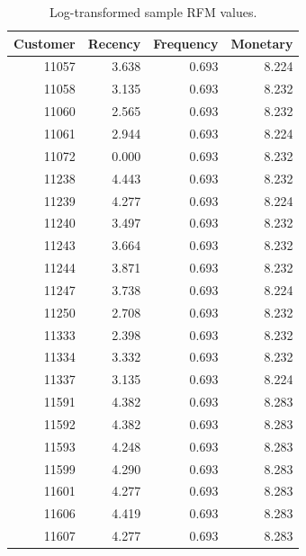 \begin{table}[htbp]
  \centering
  \small
  \begin{tabular}{rrrr}
    \hline
    \textbf{Customer} & \textbf{Recency} & \textbf{Frequency} & \textbf{Monetary} \\
    \hline
    11057             & 3.638            & 0.693              & 8.224             \\
    11058             & 3.135            & 0.693              & 8.232             \\
    11060             & 2.565            & 0.693              & 8.232             \\
    11061             & 2.944            & 0.693              & 8.224             \\
    11072             & 0.000            & 0.693              & 8.232             \\
    11238             & 4.443            & 0.693              & 8.232             \\
    11239             & 4.277            & 0.693              & 8.224             \\
    11240             & 3.497            & 0.693              & 8.232             \\
    11243             & 3.664            & 0.693              & 8.232             \\
    11244             & 3.871            & 0.693              & 8.232             \\
    11247             & 3.738            & 0.693              & 8.224             \\
    11250             & 2.708            & 0.693              & 8.232             \\
    11333             & 2.398            & 0.693              & 8.232             \\
    11334             & 3.332            & 0.693              & 8.232             \\
    11337             & 3.135            & 0.693              & 8.224             \\
    11591             & 4.382            & 0.693              & 8.283             \\
    11592             & 4.382            & 0.693              & 8.283             \\
    11593             & 4.248            & 0.693              & 8.283             \\
    11599             & 4.290            & 0.693              & 8.283             \\
    11601             & 4.277            & 0.693              & 8.283             \\
    11606             & 4.419            & 0.693              & 8.283             \\
    11607             & 4.277            & 0.693              & 8.283             \\
    \hline
  \end{tabular}
  \caption{Log-transformed sample RFM values.}
\end{table}

